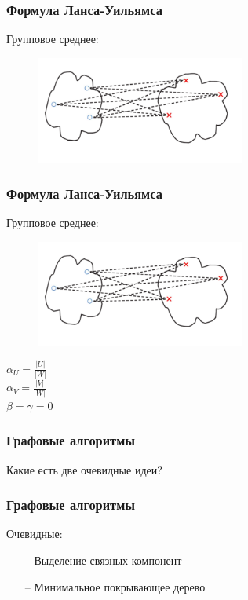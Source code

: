 \documentclass[12pt]{beamer}
\begin{document}
\begin{frame}\frametitle{Формула Ланса-Уильямса}
Групповое среднее:\\
\begin{figure}[htbp]
  \includegraphics[height=100pt, keepaspectratio = true]{images/lans3}  
\end{figure}
\end{frame}

\begin{frame}\frametitle{Формула Ланса-Уильямса}
Групповое среднее:\\
\begin{figure}[htbp]
  \includegraphics[height=100pt, keepaspectratio = true]{images/lans3}  
\end{figure}
${\alpha_U = \frac{\vert U \vert}{\vert W \vert}}$\\${\alpha_V = \frac{\vert V \vert}{\vert W \vert}}$ \\${\beta = \gamma = 0}$
\end{frame}



\begin{frame}\frametitle{Графовые алгоритмы}
Какие есть две очевидные идеи?
\end{frame}

\begin{frame}\frametitle{Графовые алгоритмы}
Очевидные:\\
\begin{itemize}
\item[--] Выделение связных компонент
\item[--] Минимальное покрывающее дерево
\end{itemize}
\end{frame}
\end{document}
